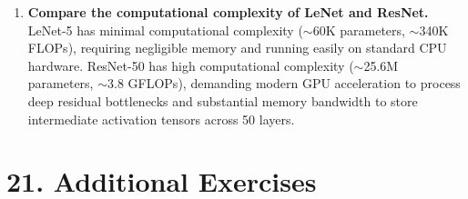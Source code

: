 \documentclass[11pt]{article}
\begin{document}
\begin{enumerate}
    \item \textbf{Compare the computational complexity of LeNet and ResNet.} \\
    LeNet-5 has minimal computational complexity ($\sim$60K parameters, $\sim$340K FLOPs), requiring negligible memory and running easily on standard CPU hardware. ResNet-50 has high computational complexity ($\sim$25.6M parameters, $\sim$3.8 GFLOPs), demanding modern GPU acceleration to process deep residual bottlenecks and substantial memory bandwidth to store intermediate activation tensors across 50 layers.
\end{enumerate}

\section*{21. Additional Exercises}
\end{document}

